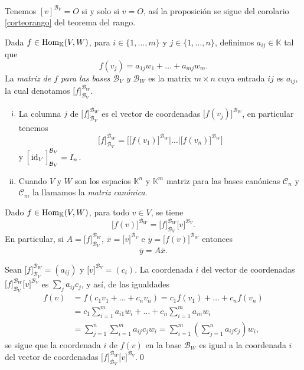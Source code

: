 \dem Tenemos $\left[ v \right]^{\mathcal{B}_V}=O$ si y solo si $v=O$, as\'i la proposici\'on se sigue del corolario \ref{corteorango} del teorema del rango. 

\begin{defn}
Dada $f\in\operatorname{Hom}_{\mathbb{K}}(V,W)$, para $i\in\{1,\ldots,m\}$ y $j\in\{1,\ldots,n\}$, definimos $a_{ij}\in \mathbb{K}$ tal que
$$f(v_j)=a_{1j}w_1+\ldots+a_{mj}w_m.$$
La \emph{matriz de $f$ para las bases $\mathcal{B}_V$ y $\mathcal{B}_W$} es la matrix $m\times n$ cuya entrada $ij$ es $a_{ij}$, la cual denotamos $\Big[ f \Big]^{\mathcal{B}_W}_{\mathcal{B}_V}$.
\end{defn}

\begin{obs}
\begin{enumerate}[(i)]
  \item La columna $j$ de $\Big[ f \Big]^{\mathcal{B}_W}_{\mathcal{B}_V}$ es el vector de coordenadas $\Big[f(v_j)\Big]^{\mathcal{B}_W}$, en particular tenemos 
$$\Big[f\Big]^{\mathcal{B}_W}_{\mathcal{B}_V}=\Bigg[\Big[ f(v_1)\Big]^{\mathcal{B}_W}\Big|\ldots \Big| \Big[ f(v_n)\Big]^{\mathcal{B}_W}\Bigg]$$
  y $\Big[\operatorname{id}_V\Big]^{\mathcal{B}_V}_{\mathcal{B}_V}=I_n$.
  \item Cuando $V$ y $W$ son los espacios $\mathbb{K}^n$ y $\mathbb{K}^m$ matriz para las bases canónicas $\mathcal{C}_n$ y $\mathcal{C}_m$ la llamamos la \emph{matriz canónica}.
\end{enumerate}
\end{obs}

\begin{prop}
Dado $f\in\operatorname{Hom}_{\mathbb{K}}(V,W)$, para todo $v\in V$, se tiene
$$\Big[ f(v)\Big]^{\mathcal{B}_W}=\Big[ f \Big]^{\mathcal{B}_W}_{\mathcal{B}_V}\Big[ v \Big]^{\mathcal{B}_V}.$$
En particular, si $A=\Big[ f \Big]^{\mathcal{B}_W}_{\mathcal{B}_V}$, $\overline{x}=\Big[ v \Big]^{\mathcal{B}_V}$ e $\overline{y}=\Big[ f(v)\Big]^{\mathcal{B}_W}$ entonces
$$\overline{y}=A\overline{x}.$$
\end{prop}

\dem Sean $\Big[ f \Big]^{\mathcal{B}_W}_{\mathcal{B}_V}=(a_{ij})$ y $\Big[v\Big]^{\mathcal{B}_V}=(c_i)$. La coordenada $i$ del vector de coordenadas $\Big[ f \Big]^{\mathcal{B}_W}_{\mathcal{B}_V}\Big[ v \Big]^{\mathcal{B}_V}$ es $\sum_j a_{ij}c_j$, y as\'i, de las igualdades
\begin{align*}
f(v) & = f(c_1v_1+\ldots+c_nv_n)=c_1f(v_1)+\ldots+c_nf(v_n)\\
 & = c_1\sum_{i=1}^m a_{i1}w_i+\ldots+c_n\sum_{i=1}^m a_{in}w_i\\
 & = \sum_{j=1}^n\sum_{i=1}^m a_{ij}c_jw_i=\sum_{i=1}^m\left(\sum_{j=1}^n a_{ij}c_j\right)w_i,
\end{align*}
se sigue que la coordenada $i$ de $f(v)$ en la base $\mathcal{B}_W$ es igual a la coordenada $i$ del vector de coordenadas  $\Big[ f \Big]^{\mathcal{B}_W}_{\mathcal{B}_V}\Big[ v \Big]^{\mathcal{B}_V}$.\qed

